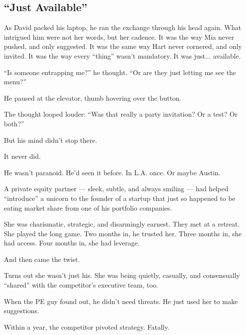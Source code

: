 \subsection{``Just Available''}

As David packed his laptop, he ran the exchange through his head again. What intrigued him were not her words, 
but her cadence. It was the way Mia never pushed, and only suggested. It was the same way Hart never cornered, and only 
invited. It was the way every ``thing'' wasn’t mandatory. It was just... available.

``Is someone entrapping me?'' he thought. ``Or are they just letting me see the menu?''

He paused at the elevator, thumb hovering over the button. 

The thought looped louder: ``Was that really a party invitation? Or a test? Or both?''

But his mind didn’t stop there.

It never did.

He wasn't paranoid. He’d seen it before. In L.A. once. Or maybe Austin.

A private equity partner --- sleek, subtle, and always smiling --- had helped ``introduce'' 
a unicorn to 
the founder of a startup that just so happened to be eating market share from one of his 
portfolio companies.

She was charismatic, strategic, and disarmingly earnest. They met at a retreat. She played the 
long game. Two months in, he trusted her. Three months in, she had access. Four months in, she 
had leverage.

And then came the twist.

Turns out she wasn’t just his. She was being quietly, casually, and consensually
``shared'' with the competitor’s executive team, 
too. 

When the PE guy found out, he didn’t need threats. He just used her to make suggestions.

Within a year, the competitor pivoted strategy. Fatally.

\medskip

